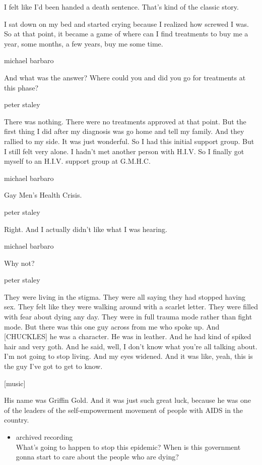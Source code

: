 I felt like I'd been handed a death sentence. That's kind of the classic
story.

I sat down on my bed and started crying because I realized how screwed I
was. So at that point, it became a game of where can I find treatments
to buy me a year, some months, a few years, buy me some time.

michael barbaro

And what was the answer? Where could you and did you go for treatments
at this phase?

peter staley

There was nothing. There were no treatments approved at that point. But
the first thing I did after my diagnosis was go home and tell my family.
And they rallied to my side. It was just wonderful. So I had this
initial support group. But I still felt very alone. I hadn't met another
person with H.I.V. So I finally got myself to an H.I.V. support group at
G.M.H.C.

michael barbaro

Gay Men's Health Crisis.

peter staley

Right. And I actually didn't like what I was hearing.

michael barbaro

Why not?

peter staley

They were living in the stigma. They were all saying they had stopped
having sex. They felt like they were walking around with a scarlet
letter. They were filled with fear about dying any day. They were in
full trauma mode rather than fight mode. But there was this one guy
across from me who spoke up. And {[}CHUCKLES{]} he was a character. He
was in leather. And he had kind of spiked hair and very goth. And he
said, well, I don't know what you're all talking about. I'm not going to
stop living. And my eyes widened. And it was like, yeah, this is the guy
I've got to get to know.

{[}music{]}

His name was Griffin Gold. And it was just such great luck, because he
was one of the leaders of the self-empowerment movement of people with
AIDS in the country.

\begin{itemize}
\tightlist
\item
  archived recording\\
  What's going to happen to stop this epidemic? When is this government
  gonna start to care about the people who are dying?
\end{itemize}

